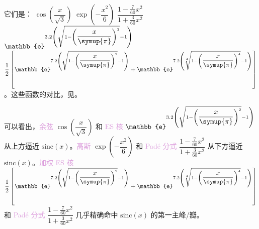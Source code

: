 它们是：{\one} $\cos \left( {\dfrac{x}{{\sqrt 3 }}} \right)$ {\two} $\exp \left( { - \dfrac{x^2}{6}} \right)$ {\three} $\dfrac{{1 - \frac{7}{{60}}{x^2}}}{{1 + \frac{3}{{60}}{x^2}}}$ {\four} $\mathbb{e}^{3.2\left(\sqrt{1-{\left( \dfrac{x}{\symup{\pi}} \right)}^2}-1\right)}$ {\five} $\dfrac{1}{2} \left[ \mathbb{e}^{7.2\left(\sqrt{1-{\left( \dfrac{x}{\symup{\pi}} \right)}^2}-1\right)} + \mathbb{e}^{7.2\left(\sqrt[4]{1-{\left( \dfrac{x}{\symup{\pi}} \right)}^4}-1\right)} \right]
$。这些函数的对比，见。

可以看出，\textcolor{Plum}{余弦} $\cos \left( {\dfrac{x}{{\sqrt 3 }}} \right)$ 和 \textcolor{Plum}{ES 核}\cite{barnettParallelNonuniformFast2019,barnettAliasingErrorExpvsqrt1z22020} $\mathbb{e}^{3.2\left(\sqrt{1-{\left( \dfrac{x}{\symup{\pi}} \right)}^2}-1\right)}$ 从上方逼近 $\text{sinc} \left( x \right)$。\textcolor{Plum}{高斯} $\exp \left( { - \dfrac{x^2}{6}} \right)$ 和 \textcolor{Plum}{Padé 分式} $\dfrac{{1 - \frac{7}{{60}}{x^2}}}{{1 + \frac{3}{{60}}{x^2}}}$ 从下方逼近 $\text{sinc} \left( x \right)$。\textcolor{Plum}{加权 ES 核} $\dfrac{1}{2} \left[ \mathbb{e}^{7.2\left(\sqrt{1-{\left( \dfrac{x}{\symup{\pi}} \right)}^2}-1\right)} + \mathbb{e}^{7.2\left(\sqrt[4]{1-{\left( \dfrac{x}{\symup{\pi}} \right)}^4}-1\right)} \right]
$ 和 \textcolor{Plum}{Padé 分式} $\dfrac{{1 - \frac{7}{{60}}{x^2}}}{{1 + \frac{3}{{60}}{x^2}}}$ 几乎精确命中 $\text{sinc} \left( x \right)$ 的第一主峰/瓣。

